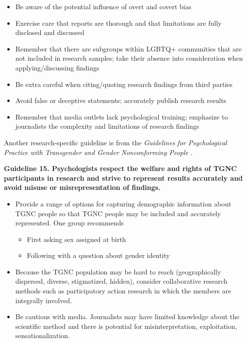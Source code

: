 \documentclass[
  english,
]{book}
\providecommand{\tightlist}{%
  \setlength{\itemsep}{0pt}\setlength{\parskip}{0pt}}
\begin{document}
\begin{itemize}
\tightlist
\item
  Be aware of the potential influence of overt and covert bias
\item
  Exercise care that reports are thorough and that limitations are fully disclosed and discussed
\item
  Remember that there are subgroups within LGBTQ+ communities that are not included in research samples; take their absence into consideration when applying/discussing findings
\item
  Be extra careful when citing/quoting research findings from third parties
\item
  Avoid false or deceptive statements; accurately publish research results
\item
  Remember that media outlets lack psychological training; emphasize to journalists the complexity and limitations of research findings
\end{itemize}

Another research-specific guideline is from the \emph{Guidelines for Psychological Practice with Transgender and Gender Nonconforming People} \citep{american_psychological_association_guidelines_2015}.

\textbf{Guideline 15. Psychologists respect the welfare and rights of TGNC participants in research and strive to represent results accurately and avoid misuse or misrepresentation of findings.}

\begin{itemize}
\tightlist
\item
  Provide a range of options for capturing demographic information about TGNC people so that TGNC people may be included and accurately represented. One group recommends

  \begin{itemize}
  \tightlist
  \item
    First asking sex assigned at birth
  \item
    Following with a question about gender identity
  \end{itemize}
\item
  Because the TGNC population may be hard to reach (geographically dispersed, diverse, stigmatized, hidden), consider collaborative research methods such as participatory action research in which the members are integrally involved.
\item
  Be cautious with media. Journalists may have limited knowledge about the scientific method and there is potential for misinterpretation, exploitation, sensationalization.
\end{itemize}
\end{document}
